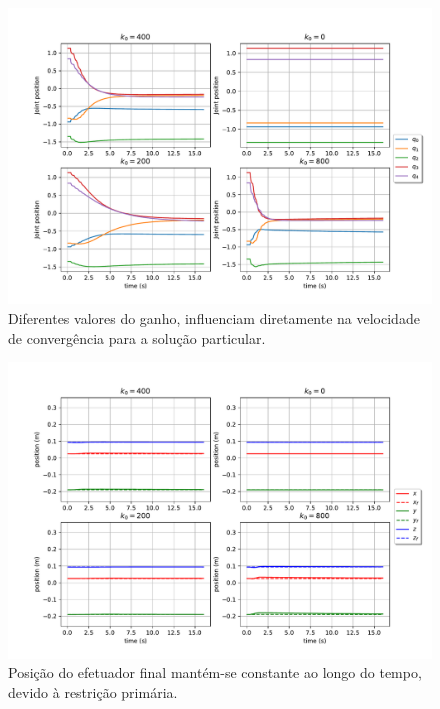\begin{figure}
	\centering
	\includegraphics[width=\textwidth]{./Images/2024-06-11-09-23-42/joint_states_joint_distance.pdf}
	\caption{Diferentes valores do ganho, influenciam diretamente na velocidade de convergência para a solução particular.}\label{fig:exp1-joint-states}
\end{figure}

\begin{figure}
	\centering
	\includegraphics[width=\textwidth]{./Images/2024-06-11-09-23-42/position_joint_distance.pdf}
	\caption{Posição do efetuador final mantém-se constante ao longo do tempo, devido à restrição primária.}\label{fig:exp1-position}
\end{figure}

